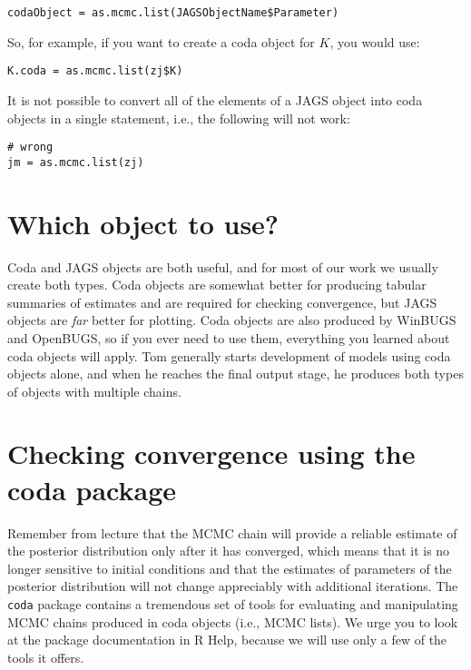 \documentclass[12pt,english]{article}
\begin{document}
{\begin{Verbatim}
codaObject = as.mcmc.list(JAGSObjectName$Parameter)
\end{Verbatim}

\noindent So, for example, if you want to create a coda object for $K$, you would use:

\begin{Verbatim}
K.coda = as.mcmc.list(zj$K)
\end{Verbatim}

\noindent It is not possible to convert all of the elements of a JAGS object into coda objects in a single statement, i.e., the following will not work:

\begin{Verbatim}
# wrong
jm = as.mcmc.list(zj)
\end{Verbatim}

\section{Which object to use?}

Coda and JAGS objects are both useful, and for most of our work we usually create both types. Coda objects are somewhat better for producing tabular summaries of estimates and are required for checking convergence, but JAGS objects are \emph{far} better for plotting. Coda objects are also produced by WinBUGS and OpenBUGS, so if you ever need to use them, everything you learned about coda objects will apply. Tom generally starts development of models using coda objects alone, and when he reaches the final output stage, he produces both types of objects with multiple chains.

\section{Checking convergence using the coda package}

Remember from lecture that the MCMC chain will provide a reliable estimate of the posterior distribution only after it has converged, which means that it is no longer sensitive to initial conditions and that the estimates of parameters of the posterior distribution will not change appreciably with additional iterations. The \texttt{coda} package contains a tremendous set of tools for evaluating and manipulating MCMC chains produced in coda objects (i.e., MCMC lists). We urge you to look at the package documentation in R Help, because we will use only a few of the tools it offers.

}
\end{document}
